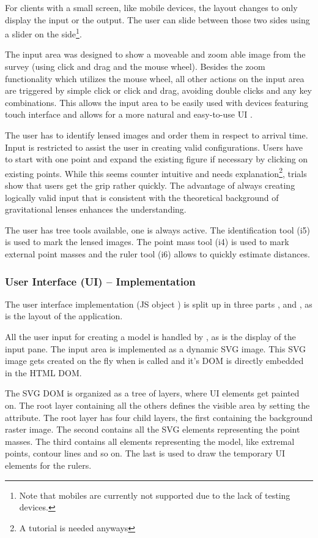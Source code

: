 For clients with a small screen, like mobile devices, the layout changes to only display the input or the output.
The user can slide between those two sides using a slider on the side\footnote{Note that mobiles are currently not supported due to the lack of testing devices.}.

The input area was designed to show a moveable and zoom able image from the survey (using click and drag and the mouse wheel).
Besides the zoom functionality which utilizes the mouse wheel, all other actions on the input area are triggered by simple click or click and drag, avoiding double clicks and any key combinations.
This allows the input area to be easily used with devices featuring touch interface and allows for a more natural and easy-to-use UI \cite{ui-ms, ui-mac}.

The user has to identify lensed images and order them in respect to arrival time.
Input is restricted to assist the user in creating valid configurations.
Users have to start with one point and expand the existing figure if necessary by clicking on existing points.
While this seems counter intuitive and needs explanation\footnote{A tutorial is needed anyways}, trials show that users get the grip rather quickly.
The advantage of always creating logically valid input that is consistent with the theoretical background of gravitational lenses enhances the understanding.

The user has tree tools available, one is always active.
The identification tool (i5) is used to mark the lensed images.
The point mass tool (i4) is used to mark external point masses and the ruler tool (i6) allows to quickly estimate distances.



\subsubsection{User Interface (UI) -- Implementation}
\label{sec:ui-impl}

The user interface implementation (JS object ) is split up in three parts ,  and , as is the layout of the application.

All the user input for creating a model is handled by , as is the display of the input pane.
The input area is implemented as a dynamic SVG image. This SVG image gets created on the fly when  is called and it's DOM is directly embedded in the HTML DOM.

The SVG DOM is organized as a tree of layers, where UI elements get painted on.
The root layer containing all the others defines the visible area by setting the  attribute.
The root layer has four child layers, the first containing the background raster image.
The second contains all the SVG elements representing the point masses.
The third contains all elements representing the model, like extremal points, contour lines and so on.
The last is used to draw the temporary UI elements for the rulers.

